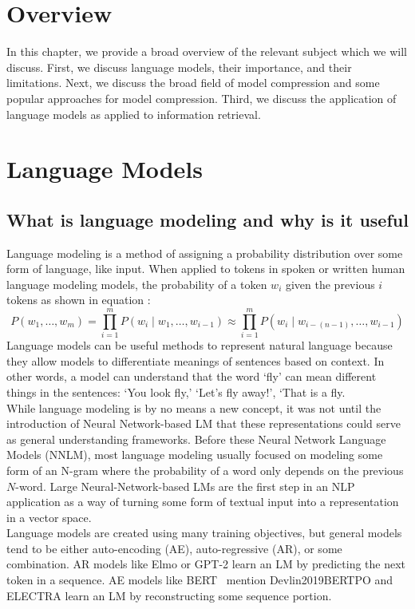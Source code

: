 \section{Overview}
In this chapter, we provide a broad overview of the relevant subject which we will discuss. First, we discuss language models, their importance, and their limitations. Next, we discuss the broad field of model compression and some popular approaches for model compression. Third, we discuss the application of language models as applied to information retrieval. 
\section{Language Models}
\subsection{What is language modeling and why is it useful}
Language modeling is a method of assigning a probability distribution over some form of language, like input. When applied to tokens in spoken or written human language modeling models, the probability of a token $w_i$ given the previous $i$ tokens as shown in equation :
\begin{equation}
    P(w_{1},\ldots ,w_{m})=\prod _{i=1}^{m}P(w_{i}\mid w_{1},\ldots ,w_{i-1})\approx \prod _{i=1}^{m}P(w_{i}\mid w_{i-(n-1)},\ldots ,w_{i-1})
\label{equation:langmodel}
\end{equation} Language models can be useful methods to represent natural language because they allow models to differentiate meanings of sentences based on context. In other words, a model can understand that the word `fly' can mean different things in the sentences: `You look fly,' `Let's fly away!', `That is a fly. \\
While language modeling is by no means a new concept, it was not until the introduction of Neural Network-based LM that these representations could serve as general understanding frameworks. Before these Neural Network Language Models (NNLM), most language modeling usually focused on modeling some form of an N-gram where the probability of a word only depends on the previous $N$-word. Large Neural-Network-based LMs are the first step in an NLP application as a way of turning some form of textual input into a representation in a vector space. \\
Language models are created using many training objectives, but general models tend to be either auto-encoding (AE), auto-regressive (AR), or some combination. AR models like Elmo \cite{Peters2018DeepCW} or GPT-2 \cite{Radford2019LanguageMA} learn an LM by predicting the next token in a sequence. AE models like BERT \ mention {Devlin2019BERTPO} and ELECTRA \cite{Clark2020ELECTRAPT} learn an LM by reconstructing some sequence portion.
